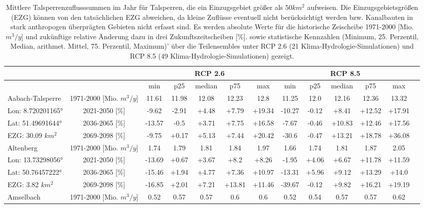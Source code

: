 \renewcommand{\arraystretch}{1.2}
\addtolength{\tabcolsep}{-5.9pt}
\scriptsize
\begin{longtable}{@{\extracolsep{\fill}}lc|ccccc||cccccc}
\caption{Mittlere Talsperrenzuflusssummen im Jahr für Talsperren, die ein Einzugsgebiet größer als $50 km^2$ aufweisen. Die Einzugsgebietsgrößen (EZG) können von den tatsächlichen EZG abweichen, da kleine Zuflüsse eventuell nicht berücksichtigt werden bzw. Kanalbauten in stark anthropogen überprägten Gebieten nicht erfasst sind. Es werden absolute Werte für die historische Zeischeibe 1971-2000 [Mio. $m^3/y$] und zukünftige relative Änderung dazu in drei Zukunftszeitscheiben [\%]. sowie statistische Kennzahlen (Minimum, 25. Perzentil, Median, arithmet. Mittel, 75. Perzentil, Maximum)' über die Teilensembles unter RCP 2.6 (21 Klima-Hydrologie-Simulationen) und RCP 8.5 (49 Klima-Hydrologie-Simulationen) gezeigt.}\\  \hline
\multicolumn{2}{c}{} & \multicolumn{5}{c||}{RCP 2.6}  & \multicolumn{5}{c}{RCP 8.5}\\ \hline
\multicolumn{2}{c|}{} & min & p25 & median & p75 & max & min & p25 & median & p75 & max\\ 
\hline 
Aabach-Talsperre & 1971-2000 [Mio. $m^3/y$]  & 11.61 & 11.98 & 12.08 & 12.23 & 12.8 & 11.25 & 12.0 & 12.16 & 12.36 & 13.32\\ 
\cline{2-12} 
Lon: 8.720201165° & 2021-2050 [\%]  & -9.62 & -2.91 & +4.48 & +7.79 & +19.34 & -10.27 & -0.12 & +8.41 & +12.52 & +17.91\\ 
Lat: 51.49691644° & 2036-2065 [\%]  & -13.57 & -0.5 & +3.71 & +7.75 & +16.58 & -7.67 & -0.46 & +10.83 & +12.46 & +17.56\\ 
EZG: 30.09 $km^2$ & 2069-2098 [\%]  & -9.75 & +0.17 & +5.13 & +7.44 & +20.42 & -30.6 & -0.47 & +13.21 & +18.78 & +36.08\\ 
\hline 
Altenberg & 1971-2000 [Mio. $m^3/y$]  & 1.74 & 1.79 & 1.81 & 1.84 & 1.97 & 1.66 & 1.74 & 1.81 & 1.87 & 2.05\\ 
\cline{2-12} 
Lon: 13.73298056° & 2021-2050 [\%]  & -13.69 & +0.67 & +3.67 & +8.2 & +8.26 & -1.95 & +4.06 & +6.67 & +11.78 & +11.59\\ 
Lat: 50.76457222° & 2036-2065 [\%]  & -15.46 & +1.94 & +4.77 & +7.36 & +10.97 & -13.31 & +5.96 & +9.12 & +13.29 & +14.0\\ 
EZG: 3.82 $km^2$ & 2069-2098 [\%]  & -16.85 & +2.01 & +7.21 & +13.81 & +11.46 & -39.67 & -0.12 & +9.82 & +16.21 & +19.19\\ 
\hline 
Amselbach & 1971-2000 [Mio. $m^3/y$]  & 0.52 & 0.57 & 0.57 & 0.6 & 0.6 & 0.52 & 0.54 & 0.57 & 0.57 & 0.62\\ 

\end{longtable}
